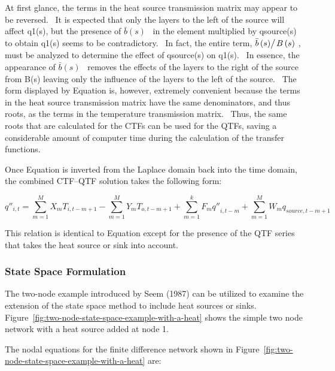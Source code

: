 At first glance, the terms in the heat source transmission matrix may appear to be reversed.~ It is expected that only the layers to the left of the source will affect q1(s), but the presence of \(\bar b\left( s \right)\) ~in the element multiplied by qsource(s) to obtain q1(s) seems to be contradictory.~ In fact, the entire term, \({{\bar b\left( s \right)} \mathord{\left/ {\vphantom {{\bar b\left( s \right)} {B\left( s \right)}}} \right. } {B\left( s \right)}}\) , must be analyzed to determine the effect of qsource(s) on q1(s).~ In essence, the appearance of \(\bar b\left( s \right)\) ~removes the effects of the layers to the right of the source from B(s) leaving only the influence of the layers to the left of the source.~ The form displayed by Equation is, however, extremely convenient because the terms in the heat source transmission matrix have the same denominators, and thus roots, as the terms in the temperature transmission matrix.~ Thus, the same roots that are calculated for the CTFs can be used for the QTFs, saving a considerable amount of computer time during the calculation of the transfer functions.

Once Equation is inverted from the Laplace domain back into the time domain, the combined CTF--QTF solution takes the following form:

\begin{equation}
{q''_{i,t}} = \sum\limits_{m = 1}^M {{X_m}{T_{i,t - m + 1}}}  - \sum\limits_{m = 1}^M {{Y_m}{T_{o,t - m + 1}}}  + \sum\limits_{m = 1}^k {{F_m}{{q''}_{i,t - m}}}  + \sum\limits_{m = 1}^M {{W_m}{q_{source,t - m + 1}}}
\end{equation}

This relation is identical to Equation except for the presence of the QTF series that takes the heat source or sink into account.

\subsubsection{State Space Formulation}\label{state-space-formulation-1}

The two-node example introduced by Seem (1987) can be utilized to examine the extension of the state space method to include heat sources or sinks.~ Figure~\ref{fig:two-node-state-space-example-with-a-heat} shows the simple two node network with a heat source added at node 1.

The nodal equations for the finite difference network shown in Figure~\ref{fig:two-node-state-space-example-with-a-heat} are:

